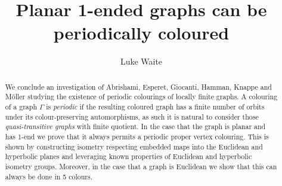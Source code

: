 \documentclass{article}
\title{Planar 1-ended graphs can be periodically coloured}
\author{Luke Waite}
\date{}
\numberwithin{equation}{section}
\theoremstyle{definition}
\theoremstyle{remark}
\begin{document}
\maketitle
\begin{abstract}
We conclude an investigation of Abrishami, Esperet, Giocanti, Hamman, Knappe and Möller studying the existence of periodic colourings of locally finite graphs. A colouring of a graph $\Gamma$ is \textit{periodic} if the resulting coloured graph has a finite number of orbits under its colour-preserving automorphisms, as such it is natural to consider those \textit{quasi-transitive graphs} with finite quotient. In the case that the graph is planar and has 1-end we prove that it always permits a periodic proper vertex colouring. This is shown by constructing isometry respecting embedded maps into the Euclidean and hyperbolic planes and leveraging known properties of Euclidean and hyperbolic isometry groups. Moreover, in the case that a graph is Euclidean we show that this can always be done in 5 colours.




\end{abstract}
\end{document}
